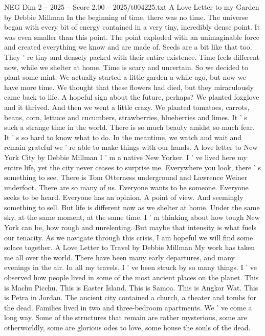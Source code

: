 \begin{textsample}{NEG Dim 2 – 2025 – Score 2.00 – 2025/t004225.txt}  \label{ex:f2_neg_003}
A Love Letter to my Garden by Debbie Millman In the beginning of time, there was no time.
The universe began with every bit of energy contained in a very tiny, incredibly dense point.
It was even smaller than this point.
The point exploded with an unimaginable force and created everything we know and are made of.
Seeds are a bit like that too.
They ' re tiny and densely packed with their entire existence.
Time feels different now, while we shelter at home.
Time is scary and uncertain.
So we decided to plant some mint.
We actually started a little garden a while ago, but now we have more time.
We thought that these flowers had died, but they miraculously came back to life.
A hopeful sign about the future, perhaps?
We planted foxglove and it thrived.
And then we went a little crazy.
We planted tomatoes, carrots, beans, corn, lettuce and cucumbers, strawberries, blueberries and limes.
It ' s such a strange time in the world.
There is so much beauty amidst so much fear.
It ' s so hard to know what to do.
In the meantime, we watch and wait and remain grateful we ' re able to make things with our hands.
A love letter to New York City by Debbie Millman I ' m a native New Yorker.
I ' ve lived here my entire life, yet the city never ceases to surprise me.
Everywhere you look, there ' s something to see.
There is Tom Otterness underground and Lawrence Weiner underfoot.
There are so many of us.
Everyone wants to be someone.
Everyone seeks to be heard.
Everyone has an opinion, A point of view.
And seemingly something to sell.
But life is different now as we shelter at home.
Under the same sky, at the same moment, at the same time.
I ' m thinking about how tough New York can be, how rough and unrelenting.
But maybe that intensity is what fuels our tenacity.
As we navigate through this crisis, I am hopeful we will find some solace together.
A Love Letter to Travel by Debbie Millman My work has taken me all over the world.
There have been many early departures, and many evenings in the air.
In all my travels, I ' ve been struck by so many things.
I ' ve observed how people lived in some of the most ancient places on the planet.
This is Machu Picchu.
This is Easter Island.
This is Samoa.
This is Angkor Wat.
This is Petra in Jordan.
The ancient city contained a church, a theater and tombs for the dead.
Families lived in two and three-bedroom apartments.
We ' ve come a long way.
Some of the structures that remain are rather mysterious, some are otherworldly, some are glorious odes to love, some house the souls of the dead.

\end{textsample}
